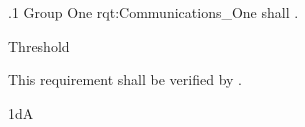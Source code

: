 


\ONERQMTV
{\RqtNumberBase.1}
{Group One}
{rqt:Communications_One}
{\ThisSys shall \TBD.}
{
	\item [Phase 1] Threshold
}
{This requirement shall be verified by \TBD.}
{
	\item [\cite{ref__BDP_FOS_CDD}] \TBD
}
{
	\item \TBD
}
{1dA}

